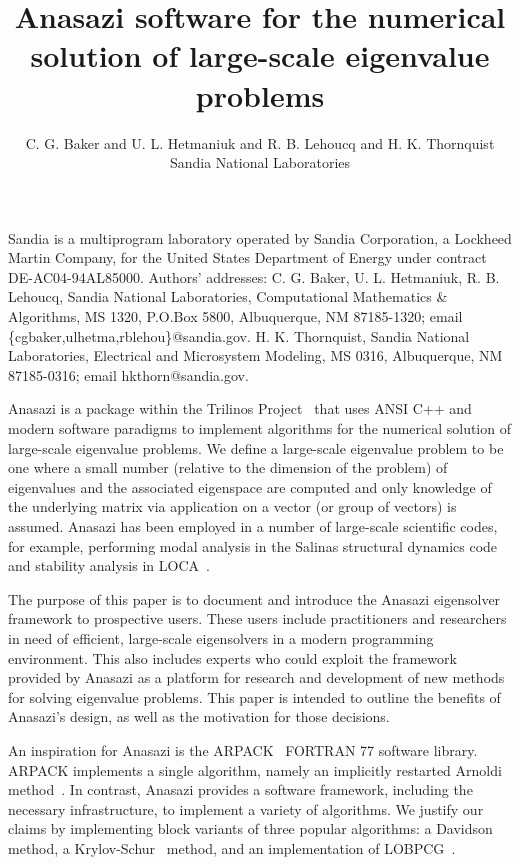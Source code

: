 \documentclass[acmtoms,acmnow]{acmtrans2m}
\title{Anasazi software for the numerical solution of large-scale eigenvalue problems}
\author{C. G. Baker and
U. L. Hetmaniuk and R. B. Lehoucq and H. K. Thornquist\\ Sandia
National Laboratories}
\let\orgsetcounter\setcounter
\begin{document}
{\let\setcounter\orgsetcounter 
\begin{bottomstuff}
Sandia is a multiprogram laboratory operated by Sandia Corporation,
a Lockheed Martin Company, for the United States Department of
Energy under contract DE-AC04-94AL85000. Authors' addresses: C. G.
Baker, U. L. Hetmaniuk, R. B. Lehoucq,
Sandia National Laboratories, Computational Mathematics \&
Algorithms, MS 1320, P.O.Box 5800, Albuquerque, NM 87185-1320; email
\{cgbaker,ulhetma,rblehou\}@sandia.gov. H. K. Thornquist, Sandia National
Laboratories, Electrical and Microsystem Modeling, MS 0316,
Albuquerque, NM 87185-0316; email hkthorn@sandia.gov.
\end{bottomstuff}
}

\maketitle

Anasazi is a package within the Trilinos Project~\cite{Heroux:2005:OTP} that uses ANSI C++
and modern software paradigms to implement algorithms for the numerical solution of
large-scale eigenvalue problems. We define a large-scale eigenvalue problem to be one
where a small number (relative to the dimension of the problem) of eigenvalues and the
associated eigenspace are computed and only knowledge of the underlying matrix via
application on a vector (or group of vectors) is assumed. Anasazi has been employed in a
number of large-scale scientific codes, for example, performing modal analysis in the
Salinas structural dynamics code~\cite{Salinas} and stability analysis in LOCA~\cite{LOCA}.

The purpose of this paper is to document and introduce the Anasazi eigensolver framework to prospective
users. These users include practitioners and researchers in need of efficient, large-scale
eigensolvers in a modern programming environment. This also includes experts who could exploit the framework provided by
Anasazi as a platform for research and development of new methods for solving eigenvalue
problems. This paper is intended to outline the benefits of Anasazi's design, as well as
the motivation for those decisions. 

An inspiration for Anasazi is the ARPACK~\cite{lesy:98} FORTRAN 77 software library.
ARPACK implements a single algorithm, namely an implicitly restarted Arnoldi
method~\cite{sore:92}. In contrast, Anasazi provides a software framework, including the
necessary infrastructure, to implement a variety of algorithms. We justify our claims by
implementing block variants of three popular algorithms: a Davidson~\cite{morganscott:86} method,
a Krylov-Schur~\cite{stew:01} method, and an implementation of LOBPCG~\cite{knya:01}.
\end{document}
